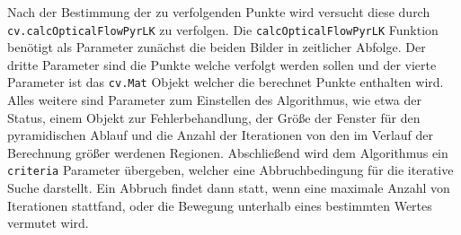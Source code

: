 Nach der Bestimmung der zu verfolgenden Punkte wird versucht diese durch \lstinline{cv.calcOpticalFlowPyrLK} zu verfolgen.
Die \lstinline{calcOpticalFlowPyrLK} Funktion benötigt als Parameter zunächst die beiden Bilder in zeitlicher Abfolge.
Der dritte Parameter sind die Punkte welche verfolgt werden sollen und der vierte Parameter ist das \lstinline{cv.Mat} Objekt welcher die berechnet Punkte enthalten wird.
Alles weitere sind Parameter zum Einstellen des Algorithmus, wie etwa der Status, einem Objekt zur Fehlerbehandlung, der Größe der Fenster für den pyramidischen Ablauf und die Anzahl der Iterationen von den im Verlauf der Berechnung größer werdenen Regionen.
Abschließend wird dem Algorithmus ein \lstinline{criteria} Parameter übergeben, welcher eine Abbruchbedingung für die iterative Suche darstellt.
Ein Abbruch findet dann statt, wenn eine maximale Anzahl von Iterationen stattfand, oder die Bewegung unterhalb eines bestimmten Wertes vermutet wird.

